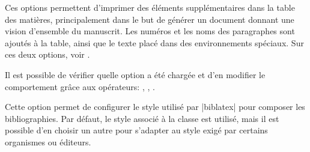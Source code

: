 \begin{noprint}
\end{noprint}

Ces options permettent d'imprimer des éléments supplémentaires dans la table des matières, principalement dans le but de générer un document donnant une vision d'ensemble du manuscrit. Les numéros et les noms des paragraphes sont ajoutés à la table, ainsi que le texte placé dans des environnements spéciaux. Sur ces deux options, voir .

\begin{developer}
Il est possible de vérifier quelle option a été chargée et d'en modifier le comportement grâce aux opérateurs: , , .
\end{developer}

\begin{noprint}
\end{noprint}

Cette option permet de configurer le style utilisé par |biblatex| pour composer les bibliographies. Par défaut, le style associé à la classe \frenchlaw est utilisé, mais il est possible d'en choisir un autre pour s'adapter au style exigé par certains organismes ou éditeurs.

